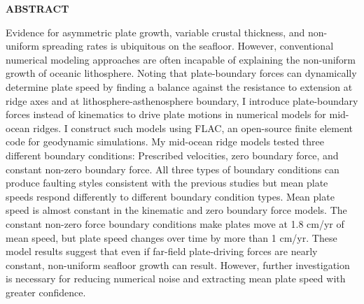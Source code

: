 \documentclass[letterpaper,12pt,notitle]{memphisthesis}                     %
\begin{document}



\doublespacing
{}

\setcounter{page}{2}

%

\newpage
\begin{center}
	\textbf{ABSTRACT}
\end{center}
\vspace{-0.15in}

\thispagestyle{plain}

Evidence for asymmetric plate growth, variable crustal thickness, and non-uniform spreading rates is ubiquitous on the seafloor. However, conventional numerical modeling approaches are often incapable of explaining the non-uniform growth of oceanic lithosphere. Noting that plate-boundary forces can dynamically determine plate speed by finding a balance against the resistance to extension at ridge axes and at lithosphere-asthenosphere boundary, I introduce plate-boundary forces instead of kinematics to drive plate motions in numerical models for mid-ocean ridges. I construct such models using FLAC, an open-source finite element code for geodynamic simulations. My mid-ocean ridge models tested three different boundary conditions: Prescribed velocities, zero boundary force, %
and constant non-zero boundary force. All three types of boundary conditions can produce faulting styles consistent with the previous studies but mean plate speeds respond differently to different boundary condition types. Mean plate speed is almost constant in the kinematic and zero boundary force models. The constant non-zero force boundary conditions make plates move at 1.8 cm/yr of mean speed, but plate speed changes over time by more than 1 cm/yr. These model results suggest that even if far-field plate-driving forces are nearly constant, non-uniform seafloor growth can result. However, further investigation is necessary for reducing numerical noise and extracting mean plate speed with greater confidence.

\newpage

\begin{singlespace}
	\tableofcontents
\end{singlespace}
\end{document}
